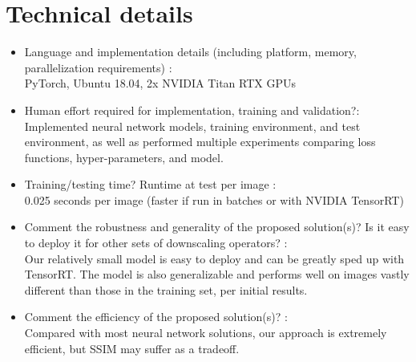 \documentclass[12pt]{article}
\begin{document}
\section{Technical details}
\begin{itemize}
\item Language and implementation details (including platform, memory, parallelization requirements) :\\ PyTorch, Ubuntu 18.04, 2x NVIDIA Titan RTX GPUs
\item Human effort required for implementation, training and validation?: \\Implemented neural network models, training environment, and test environment, as well as performed multiple experiments comparing loss functions, hyper-parameters, and model.
\item Training/testing time? Runtime at test per image : \\
0.025 seconds per image (faster if run in batches or with NVIDIA TensorRT)
\item Comment the robustness and generality of the proposed solution(s)? Is it easy to deploy it for other sets of downscaling operators? : \\
Our relatively small model is easy to deploy and can be greatly sped up with TensorRT. The model is also generalizable and performs well on images vastly different than those in the training set, per initial results.
\item Comment the efficiency of the proposed solution(s)? :\\
Compared with most neural network solutions, our approach is extremely efficient, but SSIM may suffer as a tradeoff.
\end{itemize}
\end{document}
